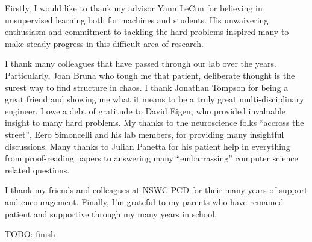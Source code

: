 Firstly, I would like to thank my advisor Yann LeCun for believing in
unsupervised learning both for machines and students. His unwaivering
enthusiasm and commitment to tackling the hard problems inspired many to make
steady progress in this difficult area of research.

I thank many colleagues that have passed through our lab over the years.
Particularly, Joan Bruna who tough me that patient, deliberate thought is the
surest way to find structure in chaos.  I thank Jonathan Tompson for being a
great friend and showing me what it means to be a truly great
multi-disciplinary engineer.  I owe a debt of gratitude to David Eigen, who
provided invaluable insight to many hard problems. My thanks to the
neuroscience folks ``accross the street'', Eero Simoncelli and his lab members,
for providing many insightful discussions. Many thanks to Julian Panetta for
his patient help in everything from proof-reading papers to answering many
``embarrassing'' computer science related questions. 
      
I thank my friends and colleagues at NSWC-PCD for their many years of support
and encouragement. Finally, I'm grateful to my parents who have remained
patient and supportive through my many years in school. 

TODO: finish 

 
